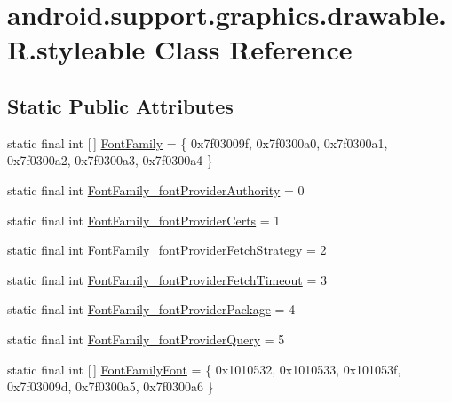 \hypertarget{classandroid_1_1support_1_1graphics_1_1drawable_1_1_r_1_1styleable}{}\section{android.\+support.\+graphics.\+drawable.\+R.\+styleable Class Reference}
\label{classandroid_1_1support_1_1graphics_1_1drawable_1_1_r_1_1styleable}
\subsection*{Static Public Attributes}
\begin{DoxyCompactItemize}
\item 
static final int \mbox{[}$\,$\mbox{]} \mbox{\hyperlink{classandroid_1_1support_1_1graphics_1_1drawable_1_1_r_1_1styleable_a9ed3605c9a5b186c41ead69f54c97e35}{Font\+Family}} = \{ 0x7f03009f, 0x7f0300a0, 0x7f0300a1, 0x7f0300a2, 0x7f0300a3, 0x7f0300a4 \}
\item 
static final int \mbox{\hyperlink{classandroid_1_1support_1_1graphics_1_1drawable_1_1_r_1_1styleable_aea009661a604f345f5f66daa64172993}{Font\+Family\+\_\+font\+Provider\+Authority}} = 0
\item 
static final int \mbox{\hyperlink{classandroid_1_1support_1_1graphics_1_1drawable_1_1_r_1_1styleable_a6f2bea77d90c424651ecdf3d423befb4}{Font\+Family\+\_\+font\+Provider\+Certs}} = 1
\item 
static final int \mbox{\hyperlink{classandroid_1_1support_1_1graphics_1_1drawable_1_1_r_1_1styleable_a94537eb07253581f3ef7233741bdaf42}{Font\+Family\+\_\+font\+Provider\+Fetch\+Strategy}} = 2
\item 
static final int \mbox{\hyperlink{classandroid_1_1support_1_1graphics_1_1drawable_1_1_r_1_1styleable_aa7d600c6df12eafcaeb73bfebb45daad}{Font\+Family\+\_\+font\+Provider\+Fetch\+Timeout}} = 3
\item 
static final int \mbox{\hyperlink{classandroid_1_1support_1_1graphics_1_1drawable_1_1_r_1_1styleable_a2d0213f333dc2c6a46402411768b63a3}{Font\+Family\+\_\+font\+Provider\+Package}} = 4
\item 
static final int \mbox{\hyperlink{classandroid_1_1support_1_1graphics_1_1drawable_1_1_r_1_1styleable_ab2b08f0a8aed25117fb484a9b644f055}{Font\+Family\+\_\+font\+Provider\+Query}} = 5
\item 
static final int \mbox{[}$\,$\mbox{]} \mbox{\hyperlink{classandroid_1_1support_1_1graphics_1_1drawable_1_1_r_1_1styleable_a60726145e283b8c41f38ab12dc70cfa0}{Font\+Family\+Font}} = \{ 0x1010532, 0x1010533, 0x101053f, 0x7f03009d, 0x7f0300a5, 0x7f0300a6 \}

\end{DoxyCompactItemize}
